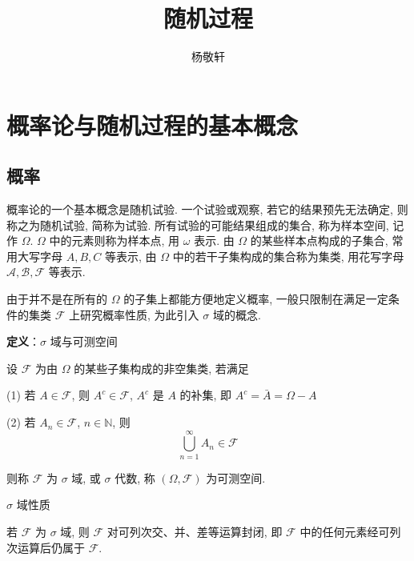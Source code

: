 \documentclass[openany]{ctexbook}
\theoremstyle{kaiti}
\theoremstyle{normal}
\begin{document}
\title{\heiti \Huge 随机过程 \vspace{0.5cm}}
\author{\LARGE\kaishu 杨敬轩 \vspace{1cm}}

\maketitle
\thispagestyle{empty}

\frontmatter

\tableofcontents

\mainmatter

\chapter{概率论与随机过程的基本概念}

\section{概率}

概率论的一个基本概念是随机试验. 一个试验或观察, 若它的结果预先无法确定, 则称之为随机试验, 简称为试验. 所有试验的可能结果组成的集合, 称为样本空间, 记作 $\Omega$. $\Omega$ 中的元素则称为样本点, 用 $\omega$ 表示. 由 $\Omega$ 的某些样本点构成的子集合, 常用大写字母 $A,B,C$ 等表示, 由 $\Omega$ 中的若干子集构成的集合称为集类, 用花写字母 $\mathcal{A},\mathcal{B},\mathcal{F}$ 等表示.

由于并不是在所有的 $\Omega$ 的子集上都能方便地定义概率, 一般只限制在满足一定条件的集类 $\mathcal{F}$ 上研究概率性质, 为此引入 $\sigma$ 域的概念.

\textbf{定义}：$\sigma$ 域与可测空间

设 $\mathcal{F}$ 为由 $\Omega$ 的某些子集构成的非空集类, 若满足

(1) 若 $A\in\mathcal{F}$, 则 $A^c\in\mathcal{F}$, $A^c$ 是 $A$ 的补集, 即 $A^c=\bar{A}=\Omega-A$

(2) 若 $A_n\in\mathcal{F}$, $n\in\mathbb{N}$, 则
\begin{equation}
  \bigcup_{n=1}^\infty A_n\in\mathcal{F}
\end{equation}

则称 $\mathcal{F}$ 为 $\sigma$ 域, 或 $\sigma$ 代数,  称 $(\Omega,\mathcal{F})$ 为可测空间.

$\sigma$ 域性质

若 $\mathcal{F}$ 为 $\sigma$ 域, 则 $\mathcal{F}$ 对可列次交、并、差等运算封闭, 即 $\mathcal{F}$ 中的任何元素经可列次运算后仍属于 $\mathcal{F}$.
\end{document}
